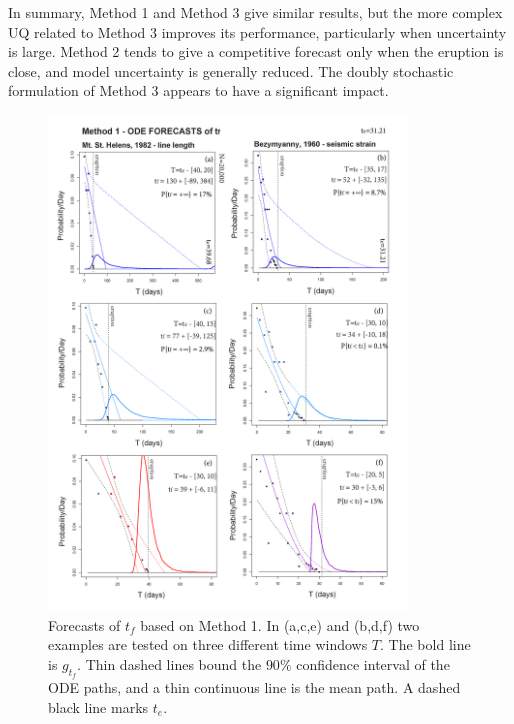 \documentclass{article}
\begin{document}
In summary, Method 1 and Method 3 give similar results, but the more complex UQ related to Method 3 improves its performance, particularly when uncertainty is large. Method 2 tends to give a competitive forecast only when the eruption is close, and model uncertainty is generally reduced. The doubly stochastic formulation of Method 3 appears to have a significant impact.

\begin{figure}[H]\vskip-0.5cm
\centering
\includegraphics[width=0.85\textwidth]{Fig13_new.png}
\caption{Forecasts of $t_f$ based on Method 1. In (a,c,e) and (b,d,f) two examples are tested on three different time windows $T$. The bold line is $g_{t_f}$. Thin dashed lines bound the $90\%$ confidence interval of the ODE paths, and a thin continuous line is the mean path. A dashed black line marks $t_e$.}
\label{Fig13}
\end{figure}
\end{document}
